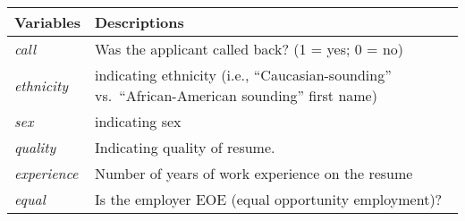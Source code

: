 \documentclass[
]{article}
\begin{document}
\begin{longtable}[]{@{}ll@{}}
\toprule
\begin{minipage}[b]{0.16\columnwidth}\raggedright
Variables\strut
\end{minipage} & \begin{minipage}[b]{0.78\columnwidth}\raggedright
Descriptions\strut
\end{minipage}\tabularnewline
\midrule
\endhead
\begin{minipage}[t]{0.16\columnwidth}\raggedright
\emph{call}\strut
\end{minipage} & \begin{minipage}[t]{0.78\columnwidth}\raggedright
Was the applicant called back? (1 = yes; 0 = no)\strut
\end{minipage}\tabularnewline
\begin{minipage}[t]{0.16\columnwidth}\raggedright
\emph{ethnicity}\strut
\end{minipage} & \begin{minipage}[t]{0.78\columnwidth}\raggedright
indicating ethnicity (i.e., ``Caucasian-sounding''
vs.~``African-American sounding'' first name)\strut
\end{minipage}\tabularnewline
\begin{minipage}[t]{0.16\columnwidth}\raggedright
\emph{sex}\strut
\end{minipage} & \begin{minipage}[t]{0.78\columnwidth}\raggedright
indicating sex\strut
\end{minipage}\tabularnewline
\begin{minipage}[t]{0.16\columnwidth}\raggedright
\emph{quality}\strut
\end{minipage} & \begin{minipage}[t]{0.78\columnwidth}\raggedright
Indicating quality of resume.\strut
\end{minipage}\tabularnewline
\begin{minipage}[t]{0.16\columnwidth}\raggedright
\emph{experience}\strut
\end{minipage} & \begin{minipage}[t]{0.78\columnwidth}\raggedright
Number of years of work experience on the resume\strut
\end{minipage}\tabularnewline
\begin{minipage}[t]{0.16\columnwidth}\raggedright
\emph{equal}\strut
\end{minipage} & \begin{minipage}[t]{0.78\columnwidth}\raggedright
Is the employer EOE (equal opportunity employment)?\strut
\end{minipage}\tabularnewline
\bottomrule
\end{longtable}
\end{document}
